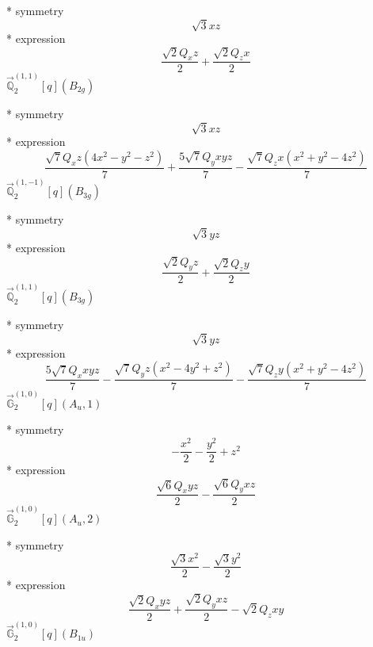 \documentclass[fleqn,8pt]{jsarticle}
\begin{document}
\noindent\quad ** symmetry
\begin{dmath*}
\sqrt{3} x z
\end{dmath*}
\noindent\quad ** expression
\begin{dmath*}
\frac{\sqrt{2} Q_{x} z}{2} + \frac{\sqrt{2} Q_{z} x}{2}
\end{dmath*}
\noindent\quad $\vec{\mathbb{Q}}_{2}^{(1,1)}[q](B_{2g})$

\noindent\quad ** symmetry
\begin{dmath*}
\sqrt{3} x z
\end{dmath*}
\noindent\quad ** expression
\begin{dmath*}
\frac{\sqrt{7} Q_{x} z \left(4 x^{2} - y^{2} - z^{2}\right)}{7} + \frac{5 \sqrt{7} Q_{y} x y z}{7} - \frac{\sqrt{7} Q_{z} x \left(x^{2} + y^{2} - 4 z^{2}\right)}{7}
\end{dmath*}
\noindent\quad $\vec{\mathbb{Q}}_{2}^{(1,-1)}[q](B_{3g})$

\noindent\quad ** symmetry
\begin{dmath*}
\sqrt{3} y z
\end{dmath*}
\noindent\quad ** expression
\begin{dmath*}
\frac{\sqrt{2} Q_{y} z}{2} + \frac{\sqrt{2} Q_{z} y}{2}
\end{dmath*}
\noindent\quad $\vec{\mathbb{Q}}_{2}^{(1,1)}[q](B_{3g})$

\noindent\quad ** symmetry
\begin{dmath*}
\sqrt{3} y z
\end{dmath*}
\noindent\quad ** expression
\begin{dmath*}
\frac{5 \sqrt{7} Q_{x} x y z}{7} - \frac{\sqrt{7} Q_{y} z \left(x^{2} - 4 y^{2} + z^{2}\right)}{7} - \frac{\sqrt{7} Q_{z} y \left(x^{2} + y^{2} - 4 z^{2}\right)}{7}
\end{dmath*}
\noindent\quad $\vec{\mathbb{G}}_{2}^{(1,0)}[q](A_{u},1)$

\noindent\quad ** symmetry
\begin{dmath*}
- \frac{x^{2}}{2} - \frac{y^{2}}{2} + z^{2}
\end{dmath*}
\noindent\quad ** expression
\begin{dmath*}
\frac{\sqrt{6} Q_{x} y z}{2} - \frac{\sqrt{6} Q_{y} x z}{2}
\end{dmath*}
\noindent\quad $\vec{\mathbb{G}}_{2}^{(1,0)}[q](A_{u},2)$

\noindent\quad ** symmetry
\begin{dmath*}
\frac{\sqrt{3} x^{2}}{2} - \frac{\sqrt{3} y^{2}}{2}
\end{dmath*}
\noindent\quad ** expression
\begin{dmath*}
\frac{\sqrt{2} Q_{x} y z}{2} + \frac{\sqrt{2} Q_{y} x z}{2} - \sqrt{2} Q_{z} x y
\end{dmath*}
\noindent\quad $\vec{\mathbb{G}}_{2}^{(1,0)}[q](B_{1u})$
\end{document}
